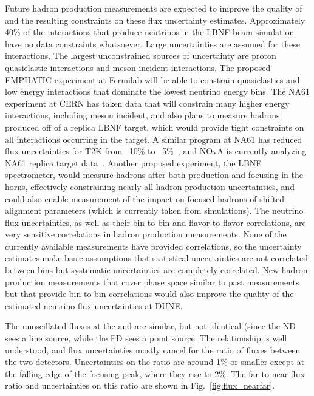  Future hadron production measurements are expected to improve the quality of and the resulting constraints on these flux uncertainty estimates.  Approximately 40\% of the interactions that produce neutrinos in the LBNF beam simulation have no data constraints whatsoever.  Large uncertainties are assumed for these interactions. The largest unconstrained sources of uncertainty are proton quasielastic interactions and meson incident interactions.  The proposed EMPHATIC experiment at Fermilab will be able to constrain quasielastics and low energy interactions that dominate the lowest neutrino energy bins.  The NA61 experiment at CERN has taken data that will constrain many higher energy interactions, including meson incident, and also plans to measure hadrons produced off of a replica LBNF target, which would provide tight constraints on all interactions occurring in the target.  A similar program at NA61 has reduced flux uncertainties for T2K from ~10\% to ~5\%~\cite{Vladisavljevic:2018prd}, and NOvA is currently analyzing NA61 replica target data~\cite{Aduszkiewicz:2222876}.  Another proposed experiment, the LBNF spectrometer, would measure hadrons after both production and focusing in the horns, effectively constraining nearly all hadron production uncertainties, and could also enable measurement of the impact on focused hadrons of shifted alignment parameters (which is currently taken from simulations).  
The neutrino flux uncertainties, as well as their bin-to-bin and  flavor-to-flavor correlations, are very sensitive correlations in hadron production measurements.  None of the currently available measurements have provided correlations, so the uncertainty estimates make basic assumptions that statistical uncertainties are not correlated between bins but systematic uncertainties are completely correlated.  New hadron production measurements that cover phase space similar to past measurements but that provide bin-to-bin correlations would also improve the quality of the estimated neutrino flux uncertainties at DUNE.     

The unoscillated fluxes at the  and  are similar, but not identical (since the ND sees a line source, while the FD sees a point source. The relationship is well understood, and flux uncertainties mostly cancel for the ratio of fluxes between the two detectors.  Uncertainties on the ratio are around 1\% or smaller except at the falling edge of the focusing peak, where they rise to 2\%. The far to near flux ratio and uncertainties on this ratio are shown in Fig.~\ref{fig:flux_nearfar}. 

